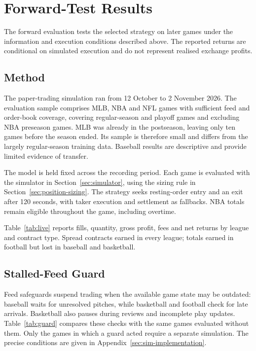 \documentclass[12pt,a4paper,oneside]{report}
\begin{document}
\section{Forward-Test Results}\label{sec:forward}
The forward evaluation tests the selected strategy on later games under the
information and execution conditions described above. The reported returns
are conditional on simulated execution and do not represent realised exchange 
profits.

\subsection{Method}
The paper-trading simulation ran from 12 October to 2 November 2026. The evaluation sample comprises
\resmainMLBAllgames{} MLB, \resmainNBAAllgames{} NBA and
\resmainNFLAllgames{} NFL games with sufficient feed and order-book coverage,
covering regular-season and playoff games and excluding NBA preseason games.
MLB was already in the postseason, leaving only ten games before the season
ended. Its sample is therefore small and differs from the largely regular-season
training data. Baseball results are descriptive and provide limited evidence
of transfer.

The model is held fixed across the recording period. Each game is evaluated
with the simulator in Section~\ref{sec:simulator}, using the sizing rule in
Section~\ref{sec:position-sizing}. The strategy seeks resting-order entry and
an exit after 120 seconds, with taker execution and settlement as fallbacks.
NBA totals remain eligible throughout the game, including overtime.



Table~\ref{tab:live} reports fills, quantity, gross profit, fees and net returns
by league and contract type. Spread contracts earned in every league; totals earned in
football but lost in baseball and basketball.

\subsection{Stalled-Feed Guard}
Feed safeguards suspend trading when the available game state may be
outdated: baseball waits for unresolved pitches, while basketball and football
check for late arrivals. Basketball also pauses during reviews and incomplete
play updates. Table~\ref{tab:guard} compares these checks with the same games
evaluated without them. Only the \resguardmetagames{} games in which a guard
acted require a separate simulation. The precise conditions are given in
Appendix~\ref{sec:sim-implementation}.
\end{document}
